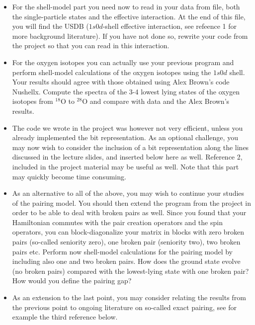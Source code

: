 \documentclass[prc]{revtex4}
\begin{document}
\begin{itemize}
\item For the shell-model part you need now to read in your data from file, both the single-particle states and the effective interaction. At the end of this file, you will find the USDB ($1s0d$-shell effective interaction, see refeence 1 for more background literature). 
If you have not done so, rewrite your code from the project so that you can read in this interaction. 
\item For the oxygen isotopes you can actually use your previous program and perform shell-model calculations of the oxygen isotopes using the $1s0d$ shell. Your results should agree with those obtained using Alex Brown's code Nushellx. Compute the spectra of the 3-4 lowest lying states of the oxygen isotopes from $^{18}$O to $^{28}$O and compare with data and the Alex Brown's results. 
\item The code we wrote in the project  was however not very efficient, unless you already implemented the bit representation. As an optional challenge, you may now wish to consider the inclusion of a bit representation along the lines discussed in the lecture slides, and inserted below here as well.  Reference 2, included in the project material may be useful as well. Note that this part may quickly become time consuming. 
\item As an alternative to all of the above, you may wish to continue your studies of the pairing model. You should then extend the program from the project  in order to be able to deal with broken pairs as well. Since you found that your Hamiltonian commutes with the pair creation operators and the spin operators, you can block-diagonalize your matrix in blocks with zero broken pairs (so-called seniority zero), one broken pair (seniority two), two broken pairs etc. 
Perform now shell-model calculations for the pairing model by including also one and two broken pairs. How does the ground state evolve (no broken pairs)
compared with the lowest-lying state with one broken pair? How would you define the pairing gap?
\item As an extension to the last point, you may consider relating the results from the previous point to ongoing literature on so-called exact pairing, see for example the third reference below.
\end{itemize}
\end{document}
